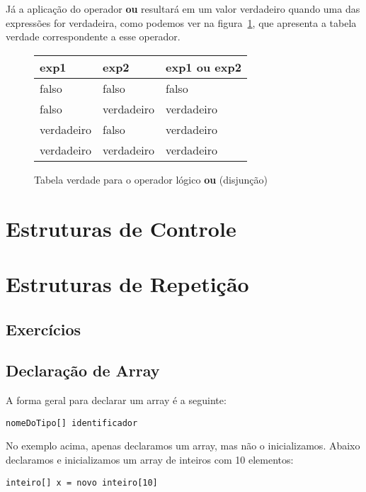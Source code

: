 \documentclass{report}
\begin{document}
Já a aplicação do operador \textbf{ou} resultará em um
valor verdadeiro quando uma das expressões for verdadeira,
como podemos ver na figura~\ref{tab:opou}, que apresenta
a tabela verdade correspondente a esse operador.

\begin{figure}
\centering
\begin{tabular}{|l|l|l|}
\hline
exp1 & exp2 & exp1 {\bf ou} exp2 \\ \hline
falso & falso & falso \\ \hline
falso & verdadeiro & verdadeiro \\ \hline
verdadeiro & falso & verdadeiro \\ \hline
verdadeiro & verdadeiro & verdadeiro \\ \hline
\end{tabular}
\label{tab:opou}
\caption{Tabela verdade para o operador lógico {\bf ou} (disjunção)}
\end{figure}







\chapter{Estruturas de Controle}

\chapter{Estruturas de Repetição}



\section{Exercícios}




\section{Declaração de Array}

A forma geral para declarar um array é a seguinte: 
\begin{verbatim}
nomeDoTipo[] identificador
\end{verbatim}

No exemplo acima, apenas declaramos um array, mas não o
inicializamos. Abaixo declaramos e inicializamos um
array de inteiros com 10 elementos:
\begin{verbatim}
inteiro[] x = novo inteiro[10]
\end{verbatim}
\end{document}
